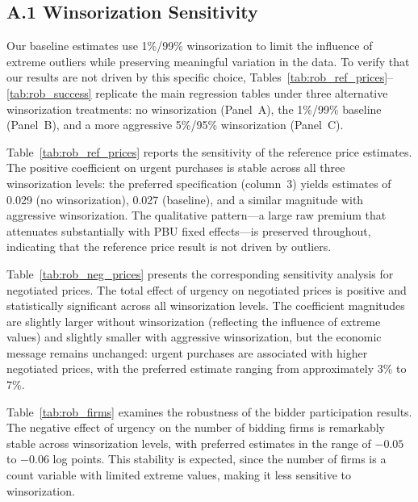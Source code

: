 \subsection*{A.1 Winsorization Sensitivity}

Our baseline estimates use 1\%/99\% winsorization to limit the influence of extreme outliers while preserving meaningful variation in the data. To verify that our results are not driven by this specific choice, Tables~\ref{tab:rob_ref_prices}--\ref{tab:rob_success} replicate the main regression tables under three alternative winsorization treatments: no winsorization (Panel~A), the 1\%/99\% baseline (Panel~B), and a more aggressive 5\%/95\% winsorization (Panel~C).

Table~\ref{tab:rob_ref_prices} reports the sensitivity of the reference price estimates. The positive coefficient on urgent purchases is stable across all three winsorization levels: the preferred specification (column~3) yields estimates of 0.029 (no winsorization), 0.027 (baseline), and a similar magnitude with aggressive winsorization. The qualitative pattern---a large raw premium that attenuates substantially with PBU fixed effects---is preserved throughout, indicating that the reference price result is not driven by outliers.



Table~\ref{tab:rob_neg_prices} presents the corresponding sensitivity analysis for negotiated prices. The total effect of urgency on negotiated prices is positive and statistically significant across all winsorization levels. The coefficient magnitudes are slightly larger without winsorization (reflecting the influence of extreme values) and slightly smaller with aggressive winsorization, but the economic message remains unchanged: urgent purchases are associated with higher negotiated prices, with the preferred estimate ranging from approximately 3\% to 7\%.



Table~\ref{tab:rob_firms} examines the robustness of the bidder participation results. The negative effect of urgency on the number of bidding firms is remarkably stable across winsorization levels, with preferred estimates in the range of $-0.05$ to $-0.06$ log points. This stability is expected, since the number of firms is a count variable with limited extreme values, making it less sensitive to winsorization.




